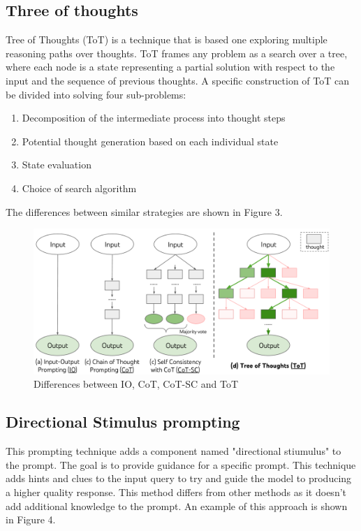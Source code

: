 \documentclass[fleqn,moreauthors,10pt]{ds_report}
\begin{document}
\subsection*{Three of thoughts}
Tree of Thoughts (ToT) \cite{ToT} is a technique that is based one exploring multiple reasoning paths over thoughts. ToT frames any problem as a search over a tree, where each node is a state representing a partial solution with respect to the input and the sequence of previous thoughts. A specific construction of ToT can be divided into solving four sub-problems:
\begin{enumerate}
    \item Decomposition of the intermediate process into thought steps
    \item Potential thought generation based on each individual state
    \item State evaluation
    \item Choice of search algorithm 
\end{enumerate}

The differences between similar strategies are shown in Figure 3.
\begin{figure}[!h]\centering
	\includegraphics[width=\linewidth]{fig/x1.png}
	\caption{Differences between IO, CoT, CoT-SC and ToT}
	\label{fig:column}
\end{figure}

\subsection*{Directional Stimulus prompting}
This prompting technique adds a component named "directional stiumulus" to the prompt. The goal is to provide guidance for a specific prompt. This technique adds hints and clues to the input query to try and guide the model to producing a higher quality response. This method differs from other methods as it doesn't add additional knowledge to the prompt. \cite{directional} An example of this approach is shown in Figure 4.
\end{document}
